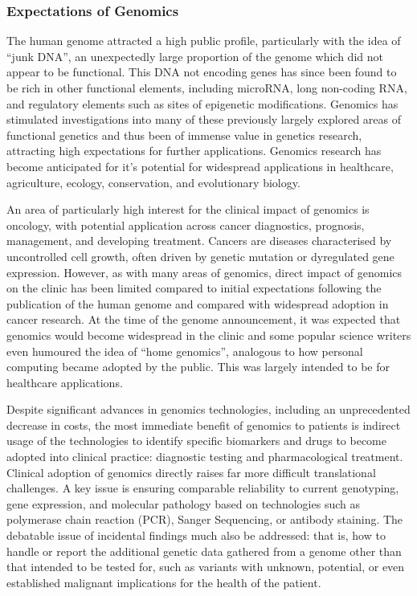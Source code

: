 \subsubsection{Expectations of Genomics}
The human genome attracted a high public profile, particularly with the idea of ``junk DNA'', an unexpectedly large proportion of the genome  which did not appear to be functional. This DNA not encoding genes has since been found to be rich in other functional elements, including microRNA, long non-coding RNA, and regulatory elements such as sites of epigenetic modifications. Genomics has stimulated investigations into many of these previously largely explored areas of functional genetics and thus been of immense value in genetics research, attracting high expectations for further applications. Genomics research has become anticipated for it's potential for widespread applications in healthcare, agriculture, ecology, conservation, and evolutionary biology.

An area of particularly high interest for the clinical impact of genomics is oncology, with potential application across cancer diagnostics, prognosis, management, and developing treatment. Cancers are diseases characterised by uncontrolled cell growth, often driven by genetic mutation or dyregulated gene expression. However, as with many areas of genomics, direct impact of genomics on the clinic has been limited compared to initial expectations following the publication of the human genome and compared with widespread adoption in cancer research. At the time of the genome announcement, it was expected that genomics would become widespread in the clinic and some popular science writers even humoured the idea of ``home genomics'', analogous to how personal computing became adopted by the public. This was largely intended to be for healthcare applications.

Despite significant advances in genomics technologies, including an unprecedented decrease in costs, the most immediate benefit of genomics to patients is indirect usage of the technologies to identify specific biomarkers and drugs to become adopted into clinical practice: diagnostic testing and pharmacological treatment. Clinical adoption of genomics directly raises far more difficult translational challenges. A key issue is ensuring comparable reliability to current genotyping, gene expression, and molecular pathology based on technologies such as polymerase chain reaction (PCR), Sanger Sequencing, or antibody staining. The debatable issue of incidental findings much also be addressed: that is, how to handle or report the additional genetic data gathered from a genome other than that intended to be tested for, such as variants with unknown, potential, or even established malignant implications for the health of the patient.

